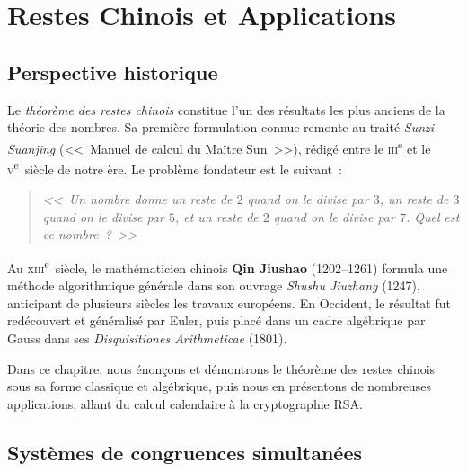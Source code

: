 \documentclass[12pt,a4paper,openany]{book}
\theoremstyle{definition}
\theoremstyle{plain}
\theoremstyle{remark}
\begin{document}
\chapter{Restes Chinois et Applications}
\label{chap:crt}

\section*{Perspective historique}

Le \emph{théorème des restes chinois} constitue l'un des
résultats les plus anciens de la théorie des nombres. Sa première formulation connue remonte
au traité \emph{Sunzi Suanjing} (<<~Manuel de calcul du Maître Sun~>>),
rédigé entre le \textsc{iii}\textsuperscript{e} et le \textsc{v}\textsuperscript{e}~siècle de
notre ère. Le problème fondateur est le suivant~:

\begin{quote}
\itshape
<<~Un nombre donne un reste de $2$ quand on le divise par $3$, un reste de $3$ quand
on le divise par $5$, et un reste de $2$ quand on le divise par $7$. Quel est ce nombre~?~>>
\end{quote}

Au \textsc{xiii}\textsuperscript{e}~siècle, le mathématicien chinois
\textbf{Qin Jiushao} (1202--1261) formula une méthode
algorithmique générale dans son ouvrage \emph{Shushu Jiuzhang} (1247),
anticipant de plusieurs siècles les travaux européens. En Occident,
le résultat fut redécouvert et généralisé par Euler, puis placé dans
un cadre algébrique par Gauss dans ses \emph{Disquisitiones Arithmeticae} (1801).

\medskip

Dans ce chapitre, nous énonçons et démontrons le théorème des restes chinois
sous sa forme classique et algébrique, puis nous en présentons de nombreuses
applications, allant du calcul calendaire à la cryptographie RSA.

\section{Systèmes de congruences simultanées}
\label{sec:crt:systemes}
\end{document}
